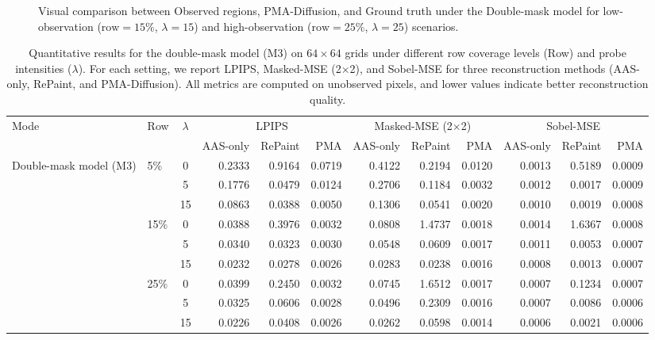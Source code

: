 \documentclass[a4paper,fleqn]{cas-sc}
\numberwithin{equation}{section}
\begin{document}
\begin{figure}[width=.99\linewidth,cols=4,pos=t]
    \caption{Visual comparison between Observed regions, PMA-Diffusion, and Ground truth under the Double-mask model for low-observation ($\text{row}=15\%$, $\lambda=15$) and high-observation ($\text{row}=25\%$, $\lambda=25$) scenarios.}
    \label{fig:qualitative}
\end{figure}


\begin{table}[width=.99\linewidth,cols=4,pos=t]
\centering
\scriptsize
\setlength{\tabcolsep}{4pt}
\caption{Quantitative results for the double-mask model (M3) on $64{\times}64$ grids under different row coverage levels (Row) and probe intensities ($\lambda$). For each setting, we report LPIPS, Masked-MSE (2$\times$2), and Sobel-MSE for three reconstruction methods (AAS-only, RePaint, and PMA-Diffusion). All metrics are computed on unobserved pixels, and lower values indicate better reconstruction quality.}
\label{tab:64_summary}
\begin{tabular}{llc rrr rrr rrr}
\toprule
\multirow{2}{*}{Mode} & \multirow{2}{*}{Row} & \multirow{2}{*}{$\lambda$} &
\multicolumn{3}{c}{LPIPS} &
\multicolumn{3}{c}{Masked-MSE (2$\times$2)} &
\multicolumn{3}{c}{Sobel-MSE} \\
\cmidrule(lr){4-6}\cmidrule(lr){7-9}\cmidrule(l){10-12}
& & & AAS-only & RePaint & PMA & AAS-only & RePaint & PMA & AAS-only & RePaint & PMA \\
\midrule
\multirow{11}{*}{Double-mask model (M3)}
& \multirow{3}{*}{5\%}
& 0  & 0.2333 & 0.9164 & 0.0719 & 0.4122 & 0.2194 & 0.0120 & 0.0013 & 0.5189 & 0.0009 \\
& & 5  & 0.1776 & 0.0479 & 0.0124 & 0.2706 & 0.1184 & 0.0032 & 0.0012 & 0.0017 & 0.0009 \\
& & 15 & 0.0863 & 0.0388 & 0.0050 & 0.1306 & 0.0541 & 0.0020 & 0.0010 & 0.0019 & 0.0008 \\
\cmidrule(lr){2-12}
& \multirow{3}{*}{15\%}
& 0  & 0.0388 & 0.3976 & 0.0032 & 0.0808 & 1.4737 & 0.0018 & 0.0014 & 1.6367 & 0.0008 \\
& & 5  & 0.0340 & 0.0323 & 0.0030 & 0.0548 & 0.0609 & 0.0017 & 0.0011 & 0.0053 & 0.0007 \\
& & 15 & 0.0232 & 0.0278 & 0.0026 & 0.0283 & 0.0238 & 0.0016 & 0.0008 & 0.0013 & 0.0007 \\
\cmidrule(lr){2-12}
& \multirow{3}{*}{25\%}
& 0  & 0.0399 & 0.2450 & 0.0032 & 0.0745 & 1.6512 & 0.0017 & 0.0007 & 0.1234 & 0.0007 \\
& & 5  & 0.0325 & 0.0606 & 0.0028 & 0.0496 & 0.2309 & 0.0016 & 0.0007 & 0.0086 & 0.0006 \\
& & 15  & 0.0226 & 0.0408 & 0.0026 & 0.0262 & 0.0598 & 0.0014 & 0.0006 & 0.0021 & 0.0006 \\
\bottomrule
\end{tabular}
\end{table}
\end{document}
